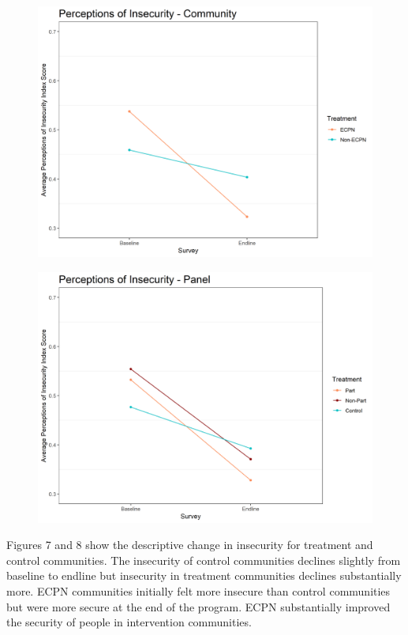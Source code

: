 \documentclass[11pt]{article}
\begin{document}
\begin{figure}[!h]
    \begin{minipage}[b]{.48\textwidth}
        \includegraphics[width=\linewidth]{../../../figs/inComm_plot.png}
        \label{fig:fig7}
    \end{minipage}
    \hfill
    \begin{minipage}[b]{.48\textwidth}
        \includegraphics[width=\linewidth]{../../../figs/inPan_plot.png}
        \label{fig:fig8}
    \end{minipage}
\end{figure}

Figures 7 and 8 show the descriptive change in insecurity for treatment
and control communities. The insecurity of control communities declines
slightly from baseline to endline but insecurity in treatment
communities declines substantially more. ECPN communities initially felt
more insecure than control communities but were more secure at the end
of the program. ECPN substantially improved the security of people in
intervention communities.
\end{document}
